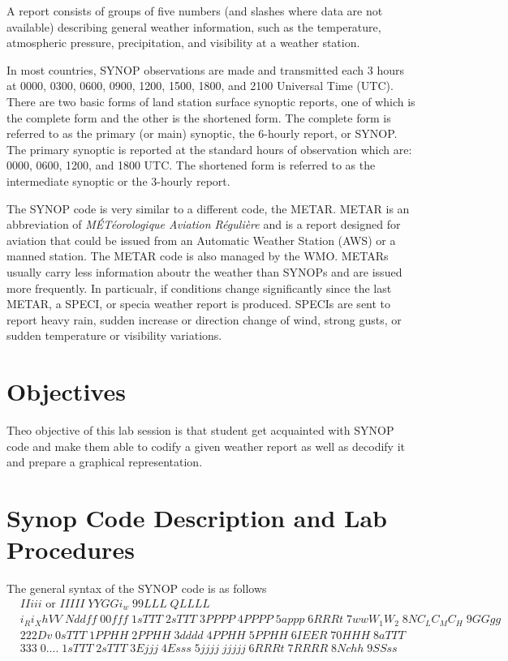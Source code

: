 \documentclass{article}
\begin{document}
A report consists  of groups of five numbers (and slashes
where data are not  available) describing general weather information,
such  as  the temperature,  atmospheric  pressure, precipitation,  and
visibility at a weather station.

In most countries, SYNOP observations are made and transmitted each 3
hours at 0000, 0300, 0600, 0900, 1200, 1500, 1800, and 2100 Universal
Time (UTC). There are two basic forms of land station surface synoptic
reports, one of which is the complete form and the other is the
shortened form. The complete form is referred to as the primary (or
main) synoptic, the 6-hourly report, or SYNOP. The primary synoptic is
reported at the standard hours of observation which are: 0000, 0600,
1200, and 1800 UTC. The shortened form is referred to as the
intermediate synoptic or the 3-hourly report.

The SYNOP code is very similar to a different code, the METAR. METAR
is an abbreviation of \textit{MÉTéorologique Aviation Régulière} and
is a report designed for aviation that could be issued from an
Automatic Weather Station (AWS) or a manned station. The METAR code is
also managed by the WMO. METARs usually carry less information aboutr
the weather than SYNOPs and are issued more frequently. In particualr,
if conditions change significantly since the last METAR, a SPECI, or
specia weather report is produced. SPECIs are sent to report heavy
rain, sudden increase or direction change of wind, strong gusts, or
sudden temperature or visibility variations.

\section{Objectives}
Theo objective of this lab session is that student get acquainted with SYNOP code and make them able to codify a given weather report as well as decodify it and prepare a graphical representation.


\section{Synop Code Description and Lab Procedures}

The general syntax of the SYNOP code is as follows
\begin{align*}
&IIiii \text{ or } IIIII\; YYGGi_w\; 99LLL\; QLLLL\\
&i_Ri_XhVV\; Nddff\; 00fff\; 1sTTT\; 2sTTT\; 3PPPP\; 4PPPP\; 5appp\; 6RRRt\; 7wwW_1W_2\; 8NC_LC_MC_H\; 9GGgg\\
&222Dv\; 0sTTT\; 1PPHH\; 2PPHH\; 3dddd\; 4PPHH\; 5PPHH\; 6IEER\; 70HHH\; 8aTTT\\
&333\; 0....\; 1sTTT\; 2sTTT\; 3Ejjj\; 4Esss\; 5jjjj\; jjjjj\; 6RRRt\; 7RRRR\; 8Nchh\; 9SSss
\end{align*}
\end{document}
